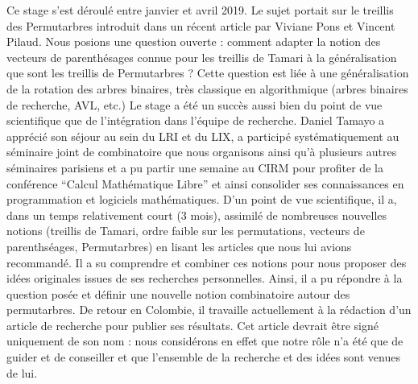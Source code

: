 \documentclass[11pt,a4paper]{letter} %
\begin{document}
\begin{letter}
Ce stage s'est déroulé entre janvier et avril 2019. Le sujet portait sur le treillis des Permutarbres introduit dans un récent article par Viviane Pons et Vincent Pilaud. Nous posions une question ouverte : comment adapter la notion des vecteurs de parenthésages connue pour les treillis de Tamari à la généralisation que sont les treillis de Permutarbres ? Cette question est liée à une généralisation de la rotation des arbres binaires, très classique en algorithmique (arbres binaires de recherche, AVL, etc.) Le stage a été un succès aussi bien du point de vue scientifique que de l'intégration dans l'équipe de recherche. Daniel Tamayo a apprécié son séjour au sein du LRI et du LIX, a participé systématiquement au séminaire joint de combinatoire que nous organisons ainsi qu'à plusieurs autres séminaires parisiens et a pu partir une semaine au CIRM pour profiter de la conférence ``Calcul Mathématique Libre'' et ainsi consolider ses connaissances en programmation et logiciels mathématiques. D'un point de vue scientifique, il a, dans un temps relativement court (3 mois), assimilé de nombreuses nouvelles notions (treillis de Tamari, ordre faible sur les permutations, vecteurs de parenthséages, Permutarbres) en lisant les articles que nous lui avions recommandé. Il a su comprendre et combiner ces notions pour nous proposer des idées originales issues de ses recherches personnelles. Ainsi, il a pu répondre à la question posée et définir une nouvelle notion combinatoire autour des permutarbres. De retour en Colombie, il travaille actuellement à la rédaction d'un article de recherche pour publier ses résultats. Cet article devrait être signé uniquement de son nom : nous considérons en effet que notre rôle n'a été que de guider et de conseiller et que l'ensemble de la recherche et des idées sont venues de lui.


\end{letter}
\end{document}
